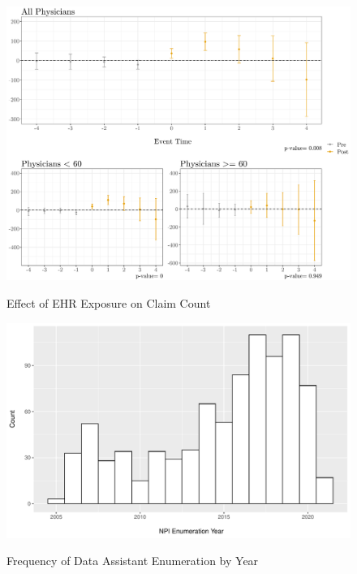 \documentclass[11pt]{article}
\begin{document}
\begin{figure}[p]
    \centering
    \caption{Effect of EHR Exposure on Claim Count}
    \includegraphics[scale=.4]{Objects/claim_plot.pdf}
    \label{fig:claim}
\end{figure}

\begin{figure}[p]
\centering
\caption{Frequency of Data Assistant Enumeration by Year}
\includegraphics[scale=.5]{Objects/dataassistant_histogram.pdf}
\label{fig:dataassistant_histogram}
\end{figure}

\clearpage

\renewcommand*{\bibfont}{\footnotesize}

\printbibliography

\clearpage
\end{document}
